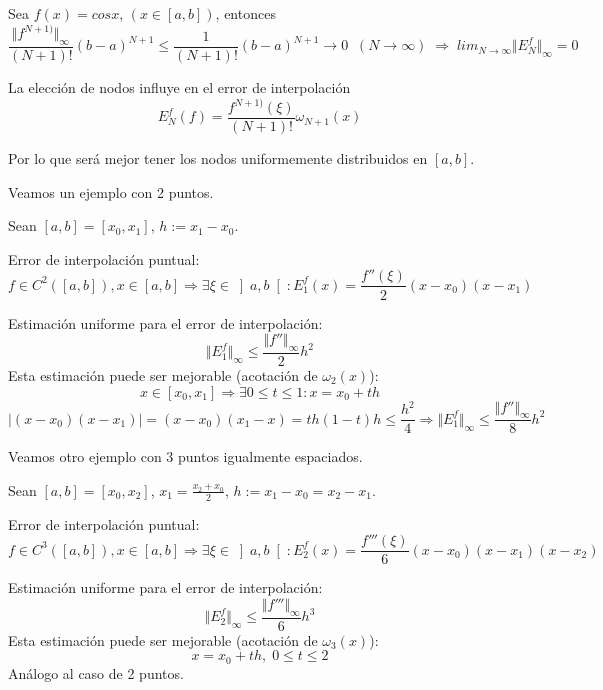 \begin{ejemplo}
Sea $f(x) = cosx$, $(x \in \left[ a,b \right] )$, entonces
\[ \frac{\Vert f^{N+1)} \Vert _\infty}{(N+1)!} (b-a)^{N+1} 
\leq \frac{1}{(N+1)!} (b-a)^{N+1} \rightarrow 0 \; \; (N \rightarrow \infty) \; \Rightarrow \; lim_{N\rightarrow \infty} \Vert E_N^f \Vert _\infty = 0 \]
\end{ejemplo}

La elección de nodos influye en el error de interpolación
\[ E_N^f(f) = \frac{f^{N+1)}(\xi )}{(N+1)!} \omega _{N+1}(x) \]

Por lo que será mejor tener los nodos uniformemente distribuidos en $\left[ a,b \right]$.

\begin{ejemplo}
Veamos un ejemplo con 2 puntos.

Sean $\left[ a,b \right] = \left[ x_0,x_1 \right]$, $h := x_1 - x_0$.

Error de interpolación puntual:
\[ f \in C^2 ( \left[ a,b \right] ), x \in \left[ a,b \right] \Rightarrow \exists \xi \in \left] a,b \right[ : E_1^f(x) = \frac{f''(\xi )}{2} (x-x_0)(x-x_1) \]

Estimación uniforme para el error de interpolación:
\[ \Vert E_1^f \Vert _\infty \leq \frac{\Vert f'' \Vert _\infty}{2}h^2 \]
Esta estimación puede ser mejorable (acotación de $\omega _2 (x)$):
\[ x \in \left[ x_0,x_1 \right] \Rightarrow \exists 0 \leq t \leq 1 : x = x_0 + th \]
\[ \vert (x-x_0) (x-x_1) \vert = (x-x_0)(x_1-x) = th(1-t)h \leq \frac{h^2}{4} \Rightarrow \Vert E_1^f \Vert _\infty \leq \frac{\Vert f'' \Vert _\infty} {8} h^2 \]
\end{ejemplo}

\begin{ejemplo}
Veamos otro ejemplo con 3 puntos igualmente espaciados.

Sean $\left[ a,b \right] = \left[ x_0,x_2 \right]$, $x_1 = \frac{x_2+x_0}{2}$, $h := x_1-x_0 = x_2-x_1$.

Error de interpolación puntual:
\[ f \in C^3 ( \left[ a,b \right] ), x \in \left[ a,b \right] \Rightarrow \exists \xi \in \left] a,b \right[ : E_2^f(x) = \frac{f'''(\xi )}{6} (x-x_0)(x-x_1)(x-x_2) \]

Estimación uniforme para el error de interpolación:
\[ \Vert E_2^f \Vert _\infty \leq \frac{\Vert f''' \Vert _\infty}{6}h^3 \]
Esta estimación puede ser mejorable (acotación de $\omega _3 (x)$):
\[ x = x_0 + th, \; 0 \leq t \leq 2 \]
Análogo al caso de 2 puntos.

\end{ejemplo}

